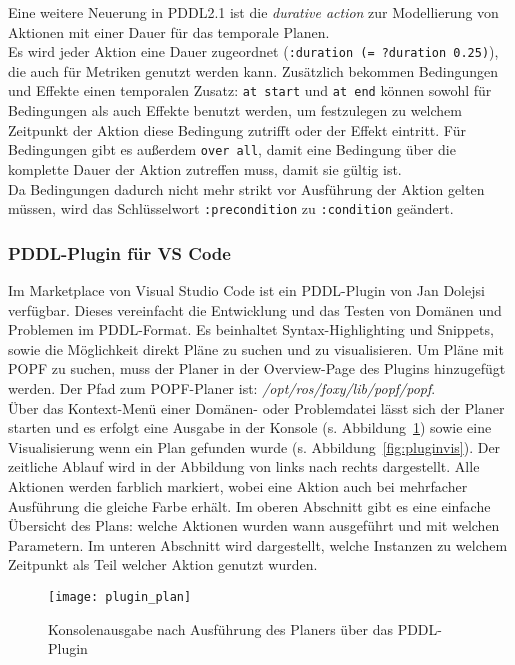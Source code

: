 Eine weitere Neuerung in \ac{PDDL}2.1 ist die \emph{durative action} zur Modellierung von Aktionen mit einer Dauer für das temporale Planen.\\
Es wird jeder Aktion eine Dauer zugeordnet (\verb|:duration (= ?duration 0.25)|), die auch für Metriken genutzt werden kann.
Zusätzlich bekommen Bedingungen und Effekte einen temporalen Zusatz: \verb|at start| und \verb|at end| können sowohl für Bedingungen als auch Effekte benutzt werden, um festzulegen zu welchem Zeitpunkt der Aktion diese Bedingung zutrifft oder der Effekt eintritt.
Für Bedingungen gibt es außerdem \verb|over all|, damit eine Bedingung über die komplette Dauer der Aktion zutreffen muss, damit sie gültig ist.\\
Da Bedingungen dadurch nicht mehr strikt vor Ausführung der Aktion gelten müssen, wird das Schlüsselwort \verb|:precondition| zu \verb|:condition| geändert.

\subsubsection{\acs{PDDL}-Plugin für VS Code}
Im Marketplace von Visual Studio Code ist ein PDDL-Plugin von Jan Dolejsi verfügbar.
Dieses vereinfacht die Entwicklung und das Testen von Domänen und Problemen im \ac{PDDL}-Format.
Es beinhaltet Syntax-Highlighting und Snippets, sowie die Möglichkeit direkt Pläne zu suchen und zu visualisieren.
Um Pläne mit \ac{POPF} zu suchen, muss der Planer in der Overview-Page des Plugins hinzugefügt werden.
Der Pfad zum \ac{POPF}-Planer ist: \emph{/opt/ros/foxy/lib/popf/popf}.\\
Über das Kontext-Menü einer Domänen- oder Problemdatei lässt sich der Planer starten und es erfolgt eine Ausgabe in der Konsole (s. Abbildung~\ref{fig:pluginplan}) sowie eine Visualisierung wenn ein Plan gefunden wurde (s. Abbildung~\ref{fig:pluginvis}).
Der zeitliche Ablauf wird in der Abbildung von links nach rechts dargestellt.
Alle Aktionen werden farblich markiert, wobei eine Aktion auch bei mehrfacher Ausführung die gleiche Farbe erhält.
Im oberen Abschnitt gibt es eine einfache Übersicht des Plans: welche Aktionen wurden wann ausgeführt und mit welchen Parametern.
Im unteren Abschnitt wird dargestellt, welche Instanzen zu welchem Zeitpunkt als Teil welcher Aktion genutzt wurden.
\begin{figure}[ht!]
    \centering
    \texttt{[image: plugin\_plan]}
    \caption{Konsolenausgabe nach Ausführung des Planers über das \acs{PDDL}-Plugin}
    \label{fig:pluginplan}
\end{figure}

